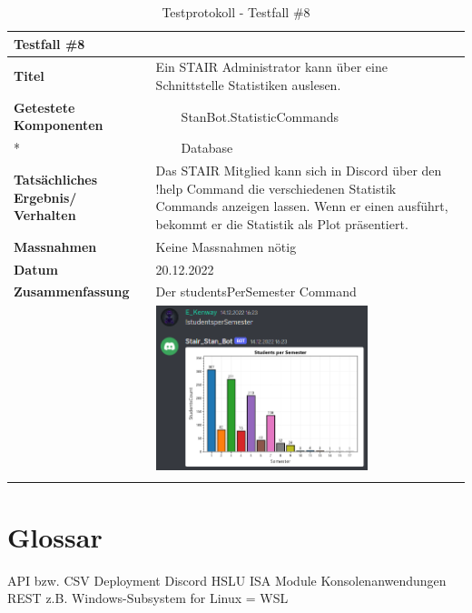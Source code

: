 \documentclass[a4paper, table]{article}
\newcommand{\tabitem}{~~\llap{\textbullet}~~}
\begin{document}
\begin{longtable}[h]{|p{9em}|p{31em}|}
    \hline
    \multicolumn{2}{|l|}{\textbf{Testfall \#8}} \\
    \hline
    \textbf{Titel} & Ein STAIR Administrator kann über eine Schnittstelle Statistiken auslesen. \\
    \hline
    \textbf{Getestete Komponenten} & 
        \tabitem StanBot.StatisticCommands \\ *
     &  \tabitem Database \\
    \hline
    \textbf{Tatsächliches Ergebnis/ Verhalten} & 
        Das STAIR Mitglied kann sich in Discord über den !help Command die verschiedenen Statistik Commands anzeigen lassen. 
        Wenn er einen ausführt, bekommt er die Statistik als Plot präsentiert. \\
    \hline
    \textbf{Massnahmen} & Keine Massnahmen nötig\\
    \hline
    \textbf{Datum} & 20.12.2022\\
    \hline
    \textbf{Zusammenfassung} & 
        Der studentsPerSemester Command \\*
     &  \includegraphics[width=0.7\textwidth]{img/Tests/8_Test_statisticCommand.png} \\
    \hline
    \caption{Testprotokoll - Testfall \#8}
\end{longtable}

\newpage
\section{Glossar}

API
bzw.
CSV
Deployment
Discord
HSLU
ISA Module
Konsolenanwendungen
REST
z.B.
Windows-Subsystem for Linux = WSL

\end{document}
